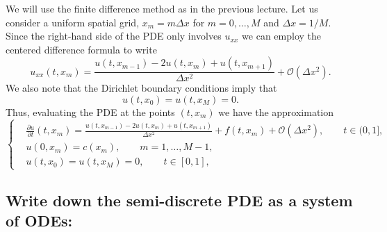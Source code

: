 We will use the finite difference method as in the previous lecture. 
Let us consider a uniform spatial grid, 
$x_m = m \Delta x$ for $m =0, \dots, M$ and $\Delta x = 1/M$. 
Since the right-hand side of the PDE only involves $u_{xx}$ we can employ 
the centered difference formula to write 
\begin{equation*}
    u_{xx}(t, x_m)  = \frac{u(t, x_{m-1}) - 2 u(t, x_m) + u(t, x_{m+1})}{\Delta x^2} 
    + \mathcal{O}(\Delta x^2). 
\end{equation*}
We also note that the Dirichlet boundary conditions imply that 
\begin{equation*}
    u(t, x_0) = u(t, x_M) = 0.
\end{equation*}
Thus, evaluating the PDE at the points $(t, x_m)$ we have the approximation 
\begin{equation*}
    \left\{
\begin{aligned}
    & \frac{\partial u}{\partial t}(t, x_m) =
    \frac{u(t, x_{m-1}) - 2 u(t, x_m) + u(t, x_{m+1})}{\Delta x^2} 
      + f(t , x_m) + \mathcal{O}(\Delta x^2), \qquad t \in (0, 1], \\
    & u(0, x_m) = c(x_m), \qquad m = 1, \dots, M-1, \\ 
    & u(t, x_0) = u(t, x_M) = 0, \qquad t \in [0, 1], 
\end{aligned}
    \right.
\end{equation*}

\subsection*{Write down the semi-discrete PDE as a system of ODEs:}

